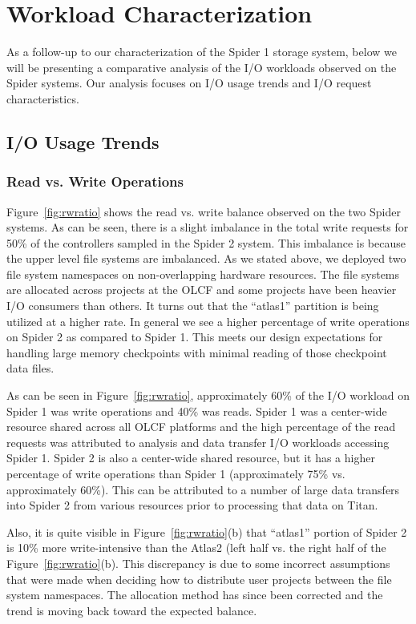 \section{Workload Characterization}
\label{sec:workloadchar}

As a follow-up to our characterization of the Spider 1 storage system, below we
will be presenting a comparative analysis of the I/O workloads observed on the
Spider systems. Our analysis focuses on I/O usage trends and I/O request
characteristics.


\subsection{I/O Usage Trends}

\subsubsection{Read vs. Write Operations}


Figure~\ref{fig:rwratio} shows the read vs. write balance observed on the two
Spider systems.  As can be seen, there is a slight imbalance in the total write
requests for 50\% of the controllers sampled in the Spider 2 system. This
imbalance is because the upper level file systems are imbalanced. As we stated
above, we deployed two file system namespaces on  non-overlapping hardware
resources. The file systems are allocated across projects at the OLCF and some
projects have been heavier I/O consumers than others. It turns out that the
``atlas1'' partition is being utilized at a higher rate.  In general we see a
higher percentage of write operations on Spider 2 as compared to Spider 1. This
meets our design expectations for handling large memory checkpoints with 
minimal reading of those checkpoint data files.

As can be seen in Figure~\ref{fig:rwratio}, approximately 60\% of
the I/O workload on Spider 1 was write
operations and 40\% was reads. Spider 1 was a center-wide resource shared
across all OLCF platforms and the high percentage of the read requests was attributed
to analysis and data transfer I/O workloads accessing Spider 1. 
Spider 2 is also a center-wide shared resource, but it has a higher percentage of write operations than Spider 1 (approximately 75\% vs. approximately 60\%).
This can be attributed to a number of large data
transfers into Spider 2 from various resources prior to processing that data on Titan.

Also, it is quite visible in Figure~\ref{fig:rwratio}(b)
that ``atlas1'' portion of Spider 2 is 10\% more write-intensive than the
Atlas2 (left half vs. the right half of the Figure~\ref{fig:rwratio}(b). 
This discrepancy is due to some incorrect assumptions that were made when
deciding how to distribute user projects 
between the file system namespaces. The allocation method has since been corrected and 
the trend is moving back toward the expected balance. 

